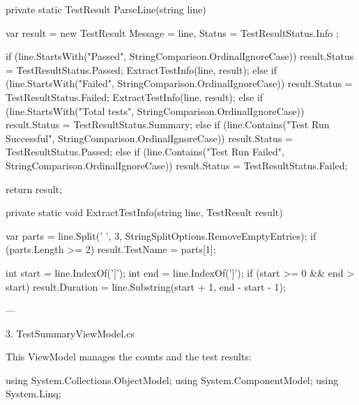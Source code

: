 {{        private static TestResult ParseLine(string line)
        {
            var result = new TestResult
            {
                Message = line,
                Status = TestResultStatus.Info
            };

            if (line.StartsWith("Passed", StringComparison.OrdinalIgnoreCase))
            {
                result.Status = TestResultStatus.Passed;
                ExtractTestInfo(line, result);
            }
            else if (line.StartsWith("Failed", StringComparison.OrdinalIgnoreCase))
            {
                result.Status = TestResultStatus.Failed;
                ExtractTestInfo(line, result);
            }
            else if (line.StartsWith("Total tests", StringComparison.OrdinalIgnoreCase))
            {
                result.Status = TestResultStatus.Summary;
            }
            else if (line.Contains("Test Run Successful", StringComparison.OrdinalIgnoreCase))
            {
                result.Status = TestResultStatus.Passed;
            }
            else if (line.Contains("Test Run Failed", StringComparison.OrdinalIgnoreCase))
            {
                result.Status = TestResultStatus.Failed;
            }

            return result;
        }

        private static void ExtractTestInfo(string line, TestResult result)
        {
            var parts = line.Split(' ', 3, StringSplitOptions.RemoveEmptyEntries);
            if (parts.Length >= 2)
                result.TestName = parts[1];

            int start = line.IndexOf('[');
            int end = line.IndexOf(']');
            if (start >= 0 && end > start)
                result.Duration = line.Substring(start + 1, end - start - 1);
        }
    }
}


---

3. TestSummaryViewModel.cs

This ViewModel manages the counts and the test results:

using System.Collections.ObjectModel;
using System.ComponentModel;
using System.Linq;

